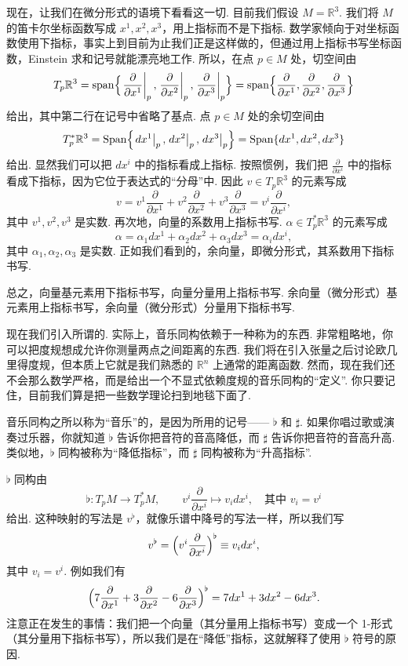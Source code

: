 现在，让我们在微分形式的语境下看看这一切. 目前我们假设 $M=\mathbb{R}^3$. 我们将 $M$ 的笛卡尔坐标函数写成 $x^1,x^2,x^3$，用上指标而不是下指标. 数学家倾向于对坐标函数使用下指标，事实上到目前为止我们正是这样做的，但通过用上指标书写坐标函数，Einstein 求和记号就能漂亮地工作. 所以，在点 $p\in M$ 处，切空间由
\[
T_p\mathbb{R}^3=\operatorname{span}\Bigl\{\left.\frac{\partial}{\partial x^1}\right|_p,\left.\frac{\partial}{\partial x^2}\right|_p,\left.\frac{\partial}{\partial x^3}\right|_p\Bigr\}
=\operatorname{span}\Bigl\{\frac{\partial}{\partial x^1},\frac{\partial}{\partial x^2},\frac{\partial}{\partial x^3}\Bigr\}
\]
给出，其中第二行在记号中省略了基点. 点 $p\in M$ 处的余切空间由
\[
T_p^*\mathbb{R}^3=\operatorname{Span}\Bigl\{\left.dx^1\right|_p,\left.dx^2\right|_p,\left.dx^3\right|_p\Bigr\}
=\operatorname{Span}\{dx^1,dx^2,dx^3\}
\]
给出. 显然我们可以把 $dx^i$ 中的指标看成上指标. 按照惯例，我们把 $\frac{\partial}{\partial x^i}$ 中的指标看成下指标，因为它位于表达式的``分母''中. 因此 $v\in T_p\mathbb{R}^3$ 的元素写成
\[
v=v^1\frac{\partial}{\partial x^1}+v^2\frac{\partial}{\partial x^2}+v^3\frac{\partial}{\partial x^3}=v^i\frac{\partial}{\partial x^i},
\]
其中 $v^1,v^2,v^3$ 是实数. 再次地，向量的系数用上指标书写. $\alpha\in T_p^*\mathbb{R}^3$ 的元素写成
\[
\alpha=\alpha_1dx^1+\alpha_2dx^2+\alpha_3dx^3=\alpha_idx^i,
\]
其中 $\alpha_1,\alpha_2,\alpha_3$ 是实数. 正如我们看到的，余向量，即微分形式，其系数用下指标书写.

总之，向量基元素用下指标书写，向量分量用上指标书写. 余向量（微分形式）基元素用上指标书写，余向量（微分形式）分量用下指标书写.

现在我们引入所谓的. 实际上，音乐同构依赖于一种称为的东西. 非常粗略地，你可以把度规想成允许你测量两点之间距离的东西. 我们将在引入张量之后讨论欧几里得度规，但本质上它就是我们熟悉的 $\mathbb{R}^n$ 上通常的距离函数. 然而，现在我们还不会那么数学严格，而是给出一个不显式依赖度规的音乐同构的``定义''. 你只要记住，目前我们算是把一些数学理论扫到地毯下面了.

音乐同构之所以称为``音乐''的，是因为所用的记号—— $\flat$ 和 $\sharp$. 如果你唱过歌或演奏过乐器，你就知道 $\flat$ 告诉你把音符的音高降低，而 $\sharp$ 告诉你把音符的音高升高. 类似地，$\flat$ 同构被称为``降低指标''，而 $\sharp$ 同构被称为``升高指标''.

$\flat$ 同构由
\[
\flat:T_pM\longrightarrow T_p^*M,\qquad v^i\frac{\partial}{\partial x^i}\longmapsto v_idx^i,\quad\text{其中 }v_i=v^i
\]
给出. 这种映射的写法是 $v^{\flat}$，就像乐谱中降号的写法一样，所以我们写
\[
v^{\flat}=\Bigl(v^i\frac{\partial}{\partial x^i}\Bigr)^{\flat}\equiv v_idx^i,
\]
其中 $v_i=v^i$. 例如我们有
\[
\Bigl(7\frac{\partial}{\partial x^1}+3\frac{\partial}{\partial x^2}-6\frac{\partial}{\partial x^3}\Bigr)^{\flat}=7dx^1+3dx^2-6dx^3.
\]
注意正在发生的事情：我们把一个向量（其分量用上指标书写）变成一个 1-形式（其分量用下指标书写），所以我们是在``降低''指标，这就解释了使用 $\flat$ 符号的原因.


